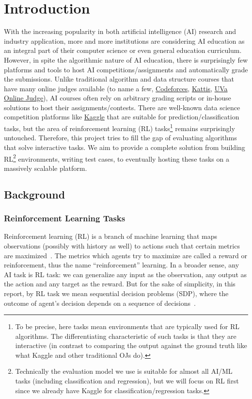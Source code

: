 \chapter{Introduction}

With the increasing popularity in both artificial intelligence (AI) research and industry application, more and more institutions are considering AI education as an integral part of their computer science or even general education curriculum. However, in spite the algorithmic nature of AI education, there is surprisingly few platforms and tools to host AI competitions/assignments and automatically grade the submissions. Unlike traditional algorithm and data structure courses that have many online judges available (to name a few, \href{https://codeforces.com/}{Codeforces}, \href{https://open.kattis.com/}{Kattis}, \href{https://onlinejudge.org/}{UVa Online Judge}), AI courses often rely on arbitrary grading scripts or in-house solutions to host their assignments/contests. There are well-known data science competition platforms like \href{https://www.kaggle.com/}{Kaggle} that are suitable for prediction/classification tasks, but the area of reinforcement learning (RL) tasks\footnote{To be precise, here tasks mean environments that are typically used for RL algorithms. The differentiating characteristic of such tasks is that they are interactive (in contrast to comparing the output against the ground truth like what Kaggle and other traditional OJs do).} remains surprisingly untouched. Therefore, this project tries to fill the gap of evaluating algorithms that solve interactive tasks. We aim to provide a complete solution from building RL\footnote{Technically the evaluation model we use is suitable for almost all AI/ML tasks (including classification and regression), but we will focus on RL first since we already have Kaggle for classification/regression tasks.} environments, writing test cases, to eventually hosting these tasks on a massively scalable platform.

\section{Background}
\subsection{Reinforcement Learning Tasks}
Reinforcement learning (RL) is a branch of machine learning that maps observations (possibly with history as well) to actions such that certain metrics are maximized~\cite{sutton-barto}. The metrics which agents try to maximize are called a reward or reinforcement, thus the name “reinforcement” learning. In a broader sense, any AI task is RL task: we can generalize any input as the observation, any output as the action and any target as the reward. But for the sake of simplicity, in this report, by RL task we mean sequential decision problems (SDP), where the outcome of agent’s decision depends on a sequence of decisions~\cite{russell}.

